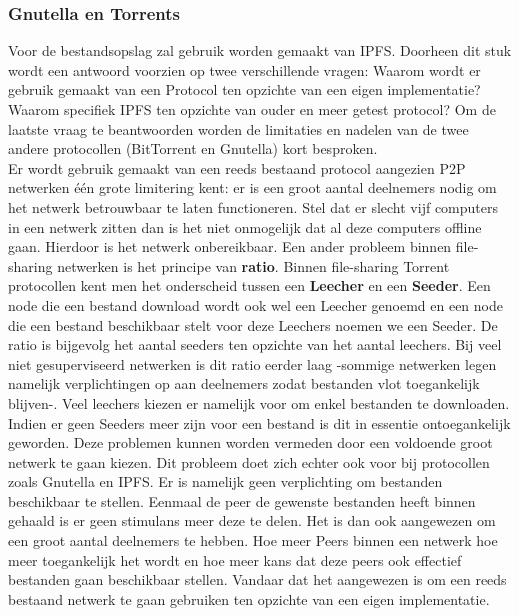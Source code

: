 \subsubsection{Gnutella en Torrents}
Voor de bestandsopslag zal gebruik worden gemaakt van IPFS. Doorheen dit stuk wordt een antwoord voorzien op twee verschillende vragen: Waarom wordt er gebruik gemaakt van een Protocol ten opzichte van een eigen implementatie? Waarom specifiek IPFS ten opzichte van ouder en meer getest protocol? Om de laatste vraag te beantwoorden worden de limitaties en nadelen van de twee andere protocollen (BitTorrent en Gnutella) kort besproken.\\

Er wordt gebruik gemaakt van een reeds bestaand protocol aangezien P2P netwerken één grote limitering kent: er is een groot aantal deelnemers nodig om het netwerk betrouwbaar te laten functioneren. Stel dat er slecht vijf computers in een netwerk zitten dan is het niet onmogelijk dat al deze computers offline gaan. Hierdoor is het netwerk onbereikbaar. Een ander probleem binnen file-sharing netwerken is het principe van \textbf{ratio}. Binnen file-sharing Torrent protocollen kent men het onderscheid tussen een \textbf{Leecher} en een \textbf{Seeder}. Een node die een bestand download wordt ook wel een Leecher genoemd en een node die een bestand beschikbaar stelt voor deze Leechers noemen we een Seeder. De ratio is bijgevolg het aantal seeders ten opzichte van het aantal leechers. Bij veel niet gesuperviseerd netwerken is dit ratio eerder laag -sommige netwerken legen namelijk verplichtingen op aan deelnemers zodat bestanden vlot toegankelijk blijven-. Veel leechers kiezen er namelijk voor om enkel bestanden te downloaden. Indien er geen Seeders meer zijn voor een bestand is dit in essentie ontoegankelijk geworden. Deze problemen kunnen worden vermeden door een voldoende groot netwerk te gaan kiezen. Dit probleem doet zich echter ook voor bij protocollen zoals Gnutella en IPFS. Er is namelijk geen verplichting om bestanden beschikbaar te stellen. Eenmaal de peer de gewenste bestanden heeft binnen gehaald is er geen stimulans meer deze te delen. Het is dan ook aangewezen om een groot aantal deelnemers te hebben. Hoe meer Peers binnen een netwerk hoe meer toegankelijk het wordt en hoe meer kans dat deze peers ook effectief bestanden gaan beschikbaar stellen. Vandaar dat het aangewezen is om een reeds bestaand netwerk te gaan gebruiken ten opzichte van een eigen implementatie.\\

